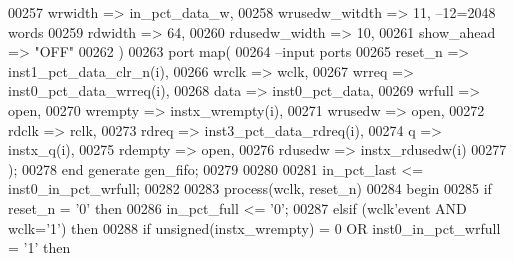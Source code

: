 \begin{DoxyCode}
00257             wrwidth         => in_pct_data_w,
00258             wrusedw_witdth  => \textcolor{vhdllogic}{11},\textcolor{keyword}{ --12=2048 words }
00259             rdwidth         => \textcolor{vhdllogic}{64},
00260             rdusedw_width   => \textcolor{vhdllogic}{10},
00261             show_ahead      => \textcolor{keyword}{"OFF"}
00262          \textcolor{vhdlchar}{)} 
00263          \textcolor{keywordflow}{port} \textcolor{keywordflow}{map}(
00264 \textcolor{keyword}{            --input ports }
00265             reset_n       => inst1_pct_data_clr_n\textcolor{vhdlchar}{(}i\textcolor{vhdlchar}{)},
00266             wrclk         => wclk,
00267             wrreq         => inst0_pct_data_wrreq\textcolor{vhdlchar}{(}i\textcolor{vhdlchar}{)},
00268             data          => inst0_pct_data,
00269             wrfull        => \textcolor{keywordflow}{open},
00270             wrempty       => instx_wrempty\textcolor{vhdlchar}{(}i\textcolor{vhdlchar}{)},
00271             wrusedw       => \textcolor{keywordflow}{open},
00272             rdclk        => rclk,
00273             rdreq         => inst3_pct_data_rdreq\textcolor{vhdlchar}{(}i\textcolor{vhdlchar}{)},
00274             q             => instx_q\textcolor{vhdlchar}{(}i\textcolor{vhdlchar}{)},
00275             rdempty       => \textcolor{keywordflow}{open},
00276             rdusedw       => instx_rdusedw\textcolor{vhdlchar}{(}i\textcolor{vhdlchar}{)}          
00277             \textcolor{vhdlchar}{)};
00278 \textcolor{keywordflow}{end} \textcolor{keywordflow}{generate} \textcolor{vhdlchar}{gen\_fifo};
00279 
00280 
00281 \textcolor{vhdlchar}{in_pct_last} \textcolor{vhdlchar}{<=} \textcolor{vhdlchar}{inst0_in_pct_wrfull};
00282 
00283 \textcolor{keywordflow}{process}(wclk, reset_n)
00284 \textcolor{vhdlkeyword}{begin}
00285    \textcolor{keywordflow}{if} \textcolor{vhdlchar}{reset_n} \textcolor{vhdlchar}{=} \textcolor{vhdlchar}{'}\textcolor{vhdllogic}{}\textcolor{vhdllogic}{0}\textcolor{vhdlchar}{'} \textcolor{keywordflow}{then} 
00286       \textcolor{vhdlchar}{in_pct_full} \textcolor{vhdlchar}{<=} \textcolor{vhdlchar}{'}\textcolor{vhdllogic}{}\textcolor{vhdllogic}{0}\textcolor{vhdlchar}{'};
00287    \textcolor{keywordflow}{elsif} \textcolor{vhdlchar}{(}\textcolor{vhdlchar}{wclk}\textcolor{vhdlchar}{'}\textcolor{vhdlkeyword}{event} \textcolor{keywordflow}{AND} \textcolor{vhdlchar}{wclk}\textcolor{vhdlchar}{=}\textcolor{vhdlchar}{'}\textcolor{vhdllogic}{}\textcolor{vhdllogic}{1}\textcolor{vhdlchar}{'}\textcolor{vhdlchar}{)} \textcolor{keywordflow}{then} 
00288       \textcolor{keywordflow}{if} \textcolor{comment}{unsigned}\textcolor{vhdlchar}{(}\textcolor{vhdlchar}{instx_wrempty}\textcolor{vhdlchar}{)} \textcolor{vhdlchar}{=} \textcolor{vhdllogic}{}\textcolor{vhdllogic}{0} \textcolor{keywordflow}{OR} \textcolor{vhdlchar}{inst0_in_pct_wrfull} \textcolor{vhdlchar}{=} \textcolor{vhdlchar}{'}\textcolor{vhdllogic}{}\textcolor{vhdllogic}{1}\textcolor{vhdlchar}{'} \textcolor{keywordflow}{then} 

\end{DoxyCode}
